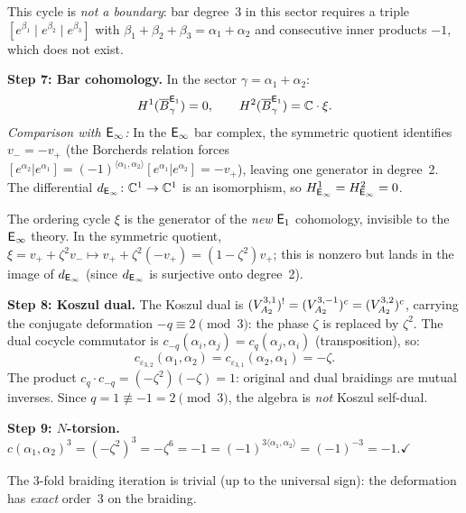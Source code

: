 \begin{computation}[\texorpdfstring{$A_2$}{A_2} at the Coxeter root: \texorpdfstring{$N = 3$}{N = 3}, \texorpdfstring{$q = 1$}{q = 1}]
This cycle is \emph{not a boundary}: bar degree~3 in this sector
requires a triple $[e^{\beta_1} \mid e^{\beta_2} \mid e^{\beta_3}]$
with $\beta_1 + \beta_2 + \beta_3 = \alpha_1 + \alpha_2$
and consecutive inner products $-1$, which does not exist.
\smallskip

\noindent\textbf{Step 7: Bar cohomology.}
In the sector $\gamma = \alpha_1 + \alpha_2$:
\[
H^1(\overline{B}^{\mathsf{E}_1}_\gamma) = 0, \qquad
H^2(\overline{B}^{\mathsf{E}_1}_\gamma) = \mathbb{C} \cdot \xi.
\]
\emph{Comparison with $\mathsf{E}_{\infty}$:}
In the $\mathsf{E}_{\infty}$ bar complex, the symmetric quotient identifies
$v_- = -v_+$ (the Borcherds relation forces
$[e^{\alpha_2} | e^{\alpha_1}]
= (-1)^{\langle\alpha_1,\alpha_2\rangle}[e^{\alpha_1} | e^{\alpha_2}]
= -v_+$), leaving one generator in degree~2.
The differential $d_{\mathsf{E}_{\infty}} \colon \mathbb{C}^1 \to \mathbb{C}^1$ is an isomorphism,
so $H^1_{\mathsf{E}_{\infty}} = H^2_{\mathsf{E}_{\infty}} = 0$.

The ordering cycle $\xi$ is the generator of the \emph{new}
$\mathsf{E}_1$ cohomology, invisible to the $\mathsf{E}_{\infty}$ theory.
In the symmetric quotient, $\xi = v_+ + \zeta^2 v_-
\mapsto v_+ + \zeta^2(-v_+) = (1 - \zeta^2)v_+$;
this is nonzero but lands in the image of $d_{\mathsf{E}_{\infty}}$
(since $d_{\mathsf{E}_{\infty}}$ is surjective onto degree~2).
\smallskip

\noindent\textbf{Step 8: Koszul dual.}
The Koszul dual is $(V_{A_2}^{3,1})^! = (V_{A_2}^{3,-1})^c
= (V_{A_2}^{3,2})^c$, carrying the conjugate deformation
$-q \equiv 2 \pmod{3}$: the phase $\zeta$ is replaced by $\zeta^2$.
The dual cocycle commutator is
$c_{-q}(\alpha_i,\alpha_j) = c_q(\alpha_j,\alpha_i)$
(transposition), so:
\[
c_{\varepsilon_{3,2}}(\alpha_1,\alpha_2)
= c_{\varepsilon_{3,1}}(\alpha_2,\alpha_1) = -\zeta.
\]
The product $c_q \cdot c_{-q} = (-\zeta^2)(-\zeta) = 1$: original and
dual braidings are mutual inverses.  Since
$q = 1 \not\equiv -1 = 2 \pmod{3}$, the algebra is \emph{not}
Koszul self-dual.
\smallskip

\noindent\textbf{Step 9: $N$-torsion.}
$c(\alpha_1,\alpha_2)^3 = (-\zeta^2)^3 = -\zeta^6 = -1
= (-1)^{3\langle\alpha_1,\alpha_2\rangle} = (-1)^{-3} = -1$.\;$\checkmark$

The 3-fold braiding iteration is trivial (up to the universal sign):
the deformation has \emph{exact} order~$3$ on the braiding.
\end{computation}



